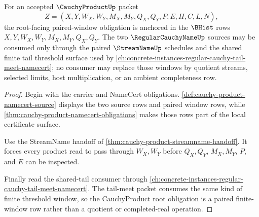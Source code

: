 \begin{theorem}
\label{thm:cauchy-product-root-window-obligations}
For an accepted $\CauchyProductUp$ packet
$$
Z=(X,Y,W_X,W_Y,M_X,M_Y,Q_X,Q_Y,P,E,H,C,L,N),
$$
the root-facing paired-window obligation is anchored in the $\BHist$ rows $X,Y,W_X,W_Y,M_X,M_Y,Q_X,Q_Y$. The two $\RegularCauchyNameUp$ sources may be consumed only through the paired $\StreamNameUp$ schedules and the shared finite tail threshold surface used by \autoref{ch:concrete-instances-regular-cauchy-tail-meet-namecert}; no consumer may replace those windows by quotient streams, selected limits, host multiplication, or an ambient completeness row.
\end{theorem}
\begin{proof}
Begin with the carrier and NameCert obligations. \autoref{def:cauchy-product-namecert-source} displays the two source rows and paired window rows, while \autoref{thm:cauchy-product-namecert-obligations} makes those rows part of the local certificate surface.

Use the StreamName handoff of \autoref{thm:cauchy-product-streamname-handoff}. It forces every product read to pass through $W_X,W_Y$ before $Q_X,Q_Y$, $M_X,M_Y$, $P$, and $E$ can be inspected.

Finally read the shared-tail consumer through \autoref{ch:concrete-instances-regular-cauchy-tail-meet-namecert}. The tail-meet packet consumes the same kind of finite threshold window, so the CauchyProduct root obligation is a paired finite-window row rather than a quotient or completed-real operation.
\end{proof}

